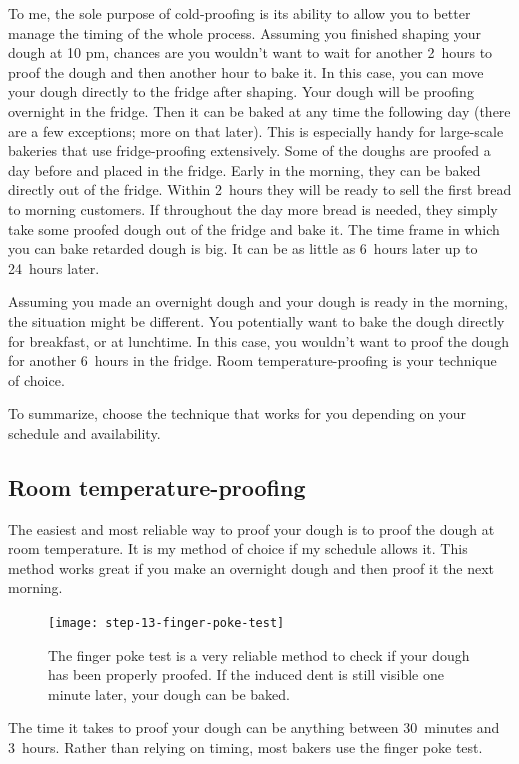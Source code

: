 To me, the sole purpose of cold-proofing is its ability to allow you to better
manage the timing of the whole process. Assuming you finished shaping your
dough at 10 pm, chances are you wouldn't want to wait for another 2~hours to
proof the dough and then another hour to bake it. In this case, you can move
your dough directly to the fridge after shaping. Your dough will be proofing
overnight in the fridge. Then it can be baked at any time the following day
(there are a few exceptions; more on that later).  This is especially handy
for large-scale bakeries that use fridge-proofing extensively. Some of the
doughs are proofed a day before and placed in the fridge.  Early in the
morning, they can be baked directly out of the fridge. Within 2~hours they
will be ready to sell the first bread to morning customers. If throughout the
day more bread is needed, they simply take some proofed dough out of the
fridge and bake it. The time frame in which you can bake retarded dough is
big. It can be as little as 6~hours later up to 24~hours later.

Assuming you made an overnight dough and your dough is ready in the morning,
the situation might be different. You potentially want to bake the dough directly
for breakfast, or at lunchtime. In this case, you wouldn't want to proof the dough for
another 6~hours in the fridge. Room temperature-proofing is your technique
of choice.

To summarize, choose the technique that works for you depending on your
schedule and availability.

\subsection{Room temperature-proofing}

The easiest and most reliable way to proof your dough is to proof the dough at
room temperature. It is my method of choice if my schedule allows it. This method
works great if you make an overnight dough and then proof it the next
morning.

\begin{figure}[htb!]
  \centering
  \texttt{[image: step-13-finger-poke-test]}
  \caption[The finger poke test]{The finger poke test is a very reliable
      method to check if your dough has been properly proofed. If the induced
      dent is still visible one minute later, your dough can be baked.}%
  \label{fig:shaping-finger-poke}
\end{figure}

The time it takes to proof your dough can be anything between 30~minutes and
3~hours. Rather than relying on timing, most bakers use the finger poke test.

